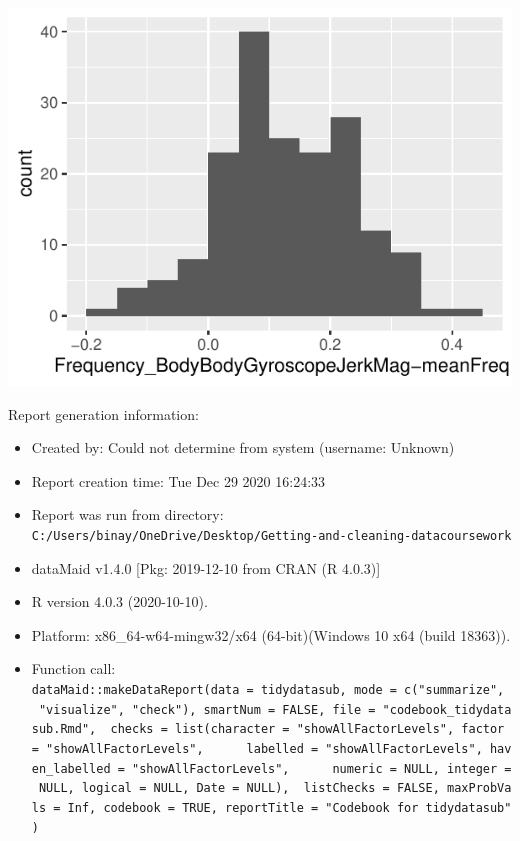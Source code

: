\documentclass[
]{article}
\begin{document}
\begin{minipage}{0.25 \textwidth}

\includegraphics{codebook_tidydatasub_files/figure-latex/Var-81-Frequency-BodyBodyGyroscopeJerkMag-meanFreq--1.pdf}

\end{minipage}

\noindent\makebox[\linewidth]{\rule{\textwidth}{0.4pt}}

Report generation information:

\begin{itemize}
\item
  Created by: Could not determine from system (username: Unknown)
\item
  Report creation time: Tue Dec 29 2020 16:24:33
\item
  Report was run from directory:
  \texttt{C:/Users/binay/OneDrive/Desktop/Getting-and-cleaning-datacoursework}
\item
  dataMaid v1.4.0 {[}Pkg: 2019-12-10 from CRAN (R 4.0.3){]}
\item
  R version 4.0.3 (2020-10-10).
\item
  Platform: x86\_64-w64-mingw32/x64 (64-bit)(Windows 10 x64 (build
  18363)).
\item
  Function call:
  \texttt{dataMaid::makeDataReport(data\ =\ tidydatasub,\ mode\ =\ c("summarize",\ \ "visualize",\ "check"),\ smartNum\ =\ FALSE,\ file\ =\ "codebook\_tidydatasub.Rmd",\ \ checks\ =\ list(character\ =\ "showAllFactorLevels",\ factor\ =\ "showAllFactorLevels",\ \ \ \ \ \ labelled\ =\ "showAllFactorLevels",\ haven\_labelled\ =\ "showAllFactorLevels",\ \ \ \ \ \ numeric\ =\ NULL,\ integer\ =\ NULL,\ logical\ =\ NULL,\ Date\ =\ NULL),\ \ listChecks\ =\ FALSE,\ maxProbVals\ =\ Inf,\ codebook\ =\ TRUE,\ reportTitle\ =\ "Codebook\ for\ tidydatasub")}
\end{itemize}
\end{document}
